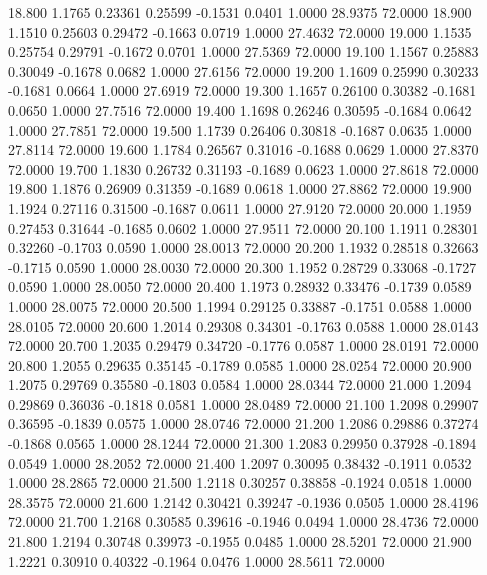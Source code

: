  18.800   1.1765   0.23361   0.25599  -0.1531   0.0401   1.0000  28.9375  72.0000
  18.900   1.1510   0.25603   0.29472  -0.1663   0.0719   1.0000  27.4632  72.0000
  19.000   1.1535   0.25754   0.29791  -0.1672   0.0701   1.0000  27.5369  72.0000
  19.100   1.1567   0.25883   0.30049  -0.1678   0.0682   1.0000  27.6156  72.0000
  19.200   1.1609   0.25990   0.30233  -0.1681   0.0664   1.0000  27.6919  72.0000
  19.300   1.1657   0.26100   0.30382  -0.1681   0.0650   1.0000  27.7516  72.0000
  19.400   1.1698   0.26246   0.30595  -0.1684   0.0642   1.0000  27.7851  72.0000
  19.500   1.1739   0.26406   0.30818  -0.1687   0.0635   1.0000  27.8114  72.0000
  19.600   1.1784   0.26567   0.31016  -0.1688   0.0629   1.0000  27.8370  72.0000
  19.700   1.1830   0.26732   0.31193  -0.1689   0.0623   1.0000  27.8618  72.0000
  19.800   1.1876   0.26909   0.31359  -0.1689   0.0618   1.0000  27.8862  72.0000
  19.900   1.1924   0.27116   0.31500  -0.1687   0.0611   1.0000  27.9120  72.0000
  20.000   1.1959   0.27453   0.31644  -0.1685   0.0602   1.0000  27.9511  72.0000
  20.100   1.1911   0.28301   0.32260  -0.1703   0.0590   1.0000  28.0013  72.0000
  20.200   1.1932   0.28518   0.32663  -0.1715   0.0590   1.0000  28.0030  72.0000
  20.300   1.1952   0.28729   0.33068  -0.1727   0.0590   1.0000  28.0050  72.0000
  20.400   1.1973   0.28932   0.33476  -0.1739   0.0589   1.0000  28.0075  72.0000
  20.500   1.1994   0.29125   0.33887  -0.1751   0.0588   1.0000  28.0105  72.0000
  20.600   1.2014   0.29308   0.34301  -0.1763   0.0588   1.0000  28.0143  72.0000
  20.700   1.2035   0.29479   0.34720  -0.1776   0.0587   1.0000  28.0191  72.0000
  20.800   1.2055   0.29635   0.35145  -0.1789   0.0585   1.0000  28.0254  72.0000
  20.900   1.2075   0.29769   0.35580  -0.1803   0.0584   1.0000  28.0344  72.0000
  21.000   1.2094   0.29869   0.36036  -0.1818   0.0581   1.0000  28.0489  72.0000
  21.100   1.2098   0.29907   0.36595  -0.1839   0.0575   1.0000  28.0746  72.0000
  21.200   1.2086   0.29886   0.37274  -0.1868   0.0565   1.0000  28.1244  72.0000
  21.300   1.2083   0.29950   0.37928  -0.1894   0.0549   1.0000  28.2052  72.0000
  21.400   1.2097   0.30095   0.38432  -0.1911   0.0532   1.0000  28.2865  72.0000
  21.500   1.2118   0.30257   0.38858  -0.1924   0.0518   1.0000  28.3575  72.0000
  21.600   1.2142   0.30421   0.39247  -0.1936   0.0505   1.0000  28.4196  72.0000
  21.700   1.2168   0.30585   0.39616  -0.1946   0.0494   1.0000  28.4736  72.0000
  21.800   1.2194   0.30748   0.39973  -0.1955   0.0485   1.0000  28.5201  72.0000
  21.900   1.2221   0.30910   0.40322  -0.1964   0.0476   1.0000  28.5611  72.0000
